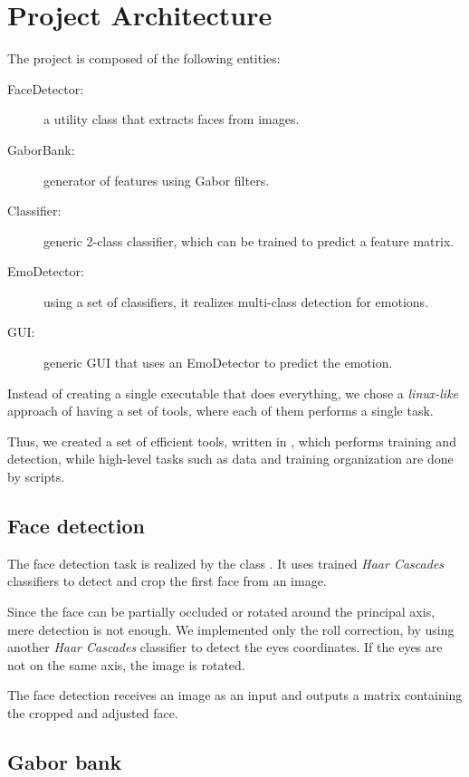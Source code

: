 \section{Project Architecture}

The project is composed of the following entities:

\begin{description}
  \item[FaceDetector:] a utility class that extracts faces from images.
  \item[GaborBank:] generator of features using Gabor filters.
  \item[Classifier:] generic 2-class classifier, which can be
    trained to predict a feature matrix.
  \item[EmoDetector:] using a set of classifiers, it realizes multi-class
    detection for emotions.
  \item[GUI:] generic GUI that uses an EmoDetector to predict the emotion.
\end{description}

Instead of creating a single executable that does everything, we chose a
\emph{linux-like} approach of having a set of tools, where each of them
performs a single task.

Thus, we created a set of efficient tools, written in , which performs
training and detection, while high-level tasks such as data and training
organization are done by  scripts.

\subsection{Face detection}

The face detection task is realized by the class . It uses
trained \emph{Haar Cascades} classifiers to detect and crop the first face
from an image.

Since the face can be partially occluded or rotated around the principal axis,
mere detection is not enough. We implemented only the roll correction, by using
another \emph{Haar Cascades} classifier to detect the eyes coordinates. If
the eyes are not on the same axis, the image is rotated.

The face detection receives an image as an input and outputs a matrix containing
the cropped and adjusted face.

\subsection{Gabor bank}

